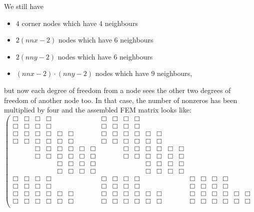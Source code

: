 We still have
\begin{itemize}
\item $4$ corner nodes which have 4 neighbours
\item $2(nnx-2)$ nodes which have 6 neighbours
\item $2(nny-2)$ nodes which have 6 neighbours
\item $(nnx-2)\cdot(nny-2)$ nodes which have 9 neighbours,
\end{itemize}
but now each degree of freedom from a node sees the other two
degrees of freedom of another node too.
In that case, the number of nonzeros has been multiplied by four
and the assembled FEM matrix looks like:
\begin{equation}
\left(
\begin{array}{cccccccccccccccccccccccc}
\Box&\Box & \Box&\Box &  &  &  &  & \Box&\Box & \Box&\Box &  &  &  &  &  &  &  &  &  &  &  &  \\
\Box&\Box & \Box&\Box &  &  &  &  & \Box&\Box & \Box&\Box &  &  &  &  &  &  &  &  &  &  &  &  \\
\Box&\Box & \Box&\Box & \Box&\Box &  &  & \Box&\Box & \Box&\Box & \Box&\Box &  &  &  &  &  &  &  &  &  &  \\
\Box&\Box & \Box&\Box & \Box&\Box &  &  & \Box&\Box & \Box&\Box & \Box&\Box &  &  &  &  &  &  &  &  &  &  \\
 &  & \Box&\Box & \Box&\Box & \Box&\Box &  &  & \Box&\Box & \Box&\Box & \Box&\Box &  &  &  &  &  &  &  &  \\
 &  & \Box&\Box & \Box&\Box & \Box&\Box &  &  & \Box&\Box & \Box&\Box & \Box&\Box &  &  &  &  &  &  &  &  \\
 &  &  &  & \Box&\Box & \Box&\Box &  &  &  &  & \Box&\Box & \Box&\Box &  &  &  &  &  &  &  &  \\
 &  &  &  & \Box&\Box & \Box&\Box &  &  &  &  & \Box&\Box & \Box&\Box &  &  &  &  &  &  &  &  \\
\Box&\Box & \Box&\Box &  &  &  &  & \Box&\Box & \Box&\Box &  &  &  &  & \Box&\Box & \Box&\Box &  &  &  &  \\
\Box&\Box & \Box&\Box &  &  &  &  & \Box&\Box & \Box&\Box &  &  &  &  & \Box&\Box & \Box&\Box &  &  &  &  \\
\Box&\Box & \Box&\Box & \Box&\Box &  &  & \Box&\Box & \Box&\Box & \Box&\Box &  &  & \Box&\Box & \Box&\Box & \Box&\Box &  &  \\
\Box&\Box & \Box&\Box & \Box&\Box &  &  & \Box&\Box & \Box&\Box & \Box&\Box &  &  & \Box&\Box & \Box&\Box & \Box&\Box &  &  \\

\end{array}
\end{equation}
